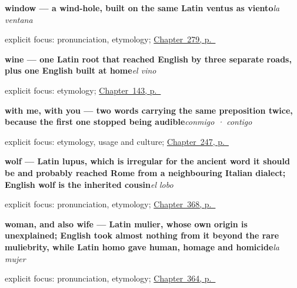 \noindent\begin{minipage}[t]{\linewidth}
\raggedright
\textbf{window — a wind-hole, built on the same Latin ventus as viento}\enspace\emph{la ventana}\par
\footnotesize explicit focus: pronunciation, etymology; \hyperref[ch:la-habitacion]{Chapter~279, p.~\pageref*{ch:la-habitacion}}
\end{minipage}\par\smallskip

\noindent\begin{minipage}[t]{\linewidth}
\raggedright
\textbf{wine — one Latin root that reached English by three separate roads, plus one English built at home}\enspace\emph{el vino}\par
\footnotesize explicit focus: etymology; \hyperref[ch:spanish-water-wine-bread]{Chapter~143, p.~\pageref*{ch:spanish-water-wine-bread}}
\end{minipage}\par\smallskip

\noindent\begin{minipage}[t]{\linewidth}
\raggedright
\textbf{with me, with you — two words carrying the same preposition twice, because the first one stopped being audible}\enspace\emph{conmigo · contigo}\par
\footnotesize explicit focus: etymology, usage and culture; \hyperref[ch:conmigo]{Chapter~247, p.~\pageref*{ch:conmigo}}
\end{minipage}\par\smallskip

\noindent\begin{minipage}[t]{\linewidth}
\raggedright
\textbf{wolf — Latin lupus, which is irregular for the ancient word it should be and probably reached Rome from a neighbouring Italian dialect; English wolf is the inherited cousin}\enspace\emph{el lobo}\par
\footnotesize explicit focus: pronunciation, etymology; \hyperref[ch:la-abeja-y-la-mosca]{Chapter~368, p.~\pageref*{ch:la-abeja-y-la-mosca}}
\end{minipage}\par\smallskip

\noindent\begin{minipage}[t]{\linewidth}
\raggedright
\textbf{woman, and also wife — Latin mulier, whose own origin is unexplained; English took almost nothing from it beyond the rare muliebrity, while Latin homo gave human, homage and homicide}\enspace\emph{la mujer}\par
\footnotesize explicit focus: pronunciation, etymology; \hyperref[ch:la-mujer-y-la-cara]{Chapter~364, p.~\pageref*{ch:la-mujer-y-la-cara}}
\end{minipage}\par\smallskip

